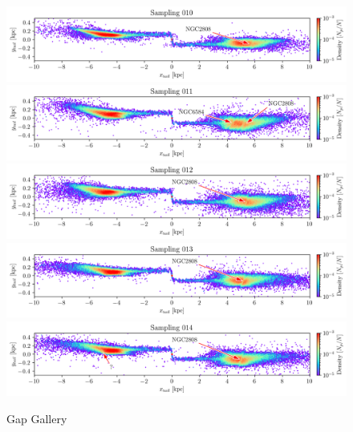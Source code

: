 \documentclass[]{aa}
\begin{document}
\begin{appendix}
    \begin{figure}
      \centering
      \includegraphics[width=\linewidth]{gallery_of_gaps_monte-carlo-010.png}
      \includegraphics[width=\linewidth]{gallery_of_gaps_monte-carlo-011.png}
      \includegraphics[width=\linewidth]{gallery_of_gaps_monte-carlo-012.png}
      \includegraphics[width=\linewidth]{gallery_of_gaps_monte-carlo-013.png}
      \includegraphics[width=\linewidth]{gallery_of_gaps_monte-carlo-014.png}
      \caption{Gap Gallery}
      \label{fig:TailCoordinates}
    \end{figure}        



\end{appendix}
\end{document}

